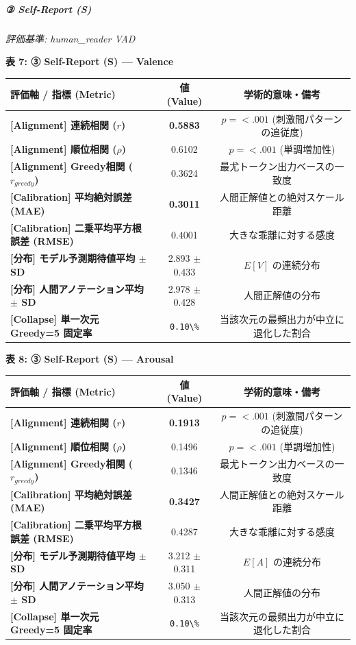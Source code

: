 \subparagraph{③ Self-Report (S)}
\textit{評価基準: human\_reader VAD}

\textbf{表 7: ③ Self-Report (S) — Valence}
\begin{center}
\small
\begin{tabular}{lcc}
\toprule
\textbf{評価軸 / 指標 (Metric)} & \textbf{値 (Value)} & \textbf{学術的意味・備考} \\
\midrule
\textbf{[Alignment] 連続相関 ($r$)} & \textbf{0.5883} & $p = <.001 $ (刺激間パターンの追従度) \\
\textbf{[Alignment] 順位相関 ($\rho$)} & 0.6102 & $p = <.001 $ (単調増加性) \\
\textbf{[Alignment] Greedy相関 ($r_{greedy}$)} & 0.3624 & 最尤トークン出力ベースの一致度 \\
\textbf{[Calibration] 平均絶対誤差 (MAE)} & \textbf{0.3011} & 人間正解値との絶対スケール距離 \\
\textbf{[Calibration] 二乗平均平方根誤差 (RMSE)} & 0.4001 & 大きな乖離に対する感度 \\
\textbf{[分布] モデル予測期待値平均 $\pm$ SD} & 2.893 $\pm$ 0.433 & $E[V]$ の連続分布 \\
\textbf{[分布] 人間アノテーション平均 $\pm$ SD} & 2.978 $\pm$ 0.428 & 人間正解値の分布 \\
\textbf{[Collapse] 単一次元 Greedy=5 固定率} & \texttt{0.10\textbackslash{}\%} & 当該次元の最頻出力が中立に退化した割合 \\
\bottomrule
\end{tabular}
\end{center}


\textbf{表 8: ③ Self-Report (S) — Arousal}
\begin{center}
\small
\begin{tabular}{lcc}
\toprule
\textbf{評価軸 / 指標 (Metric)} & \textbf{値 (Value)} & \textbf{学術的意味・備考} \\
\midrule
\textbf{[Alignment] 連続相関 ($r$)} & \textbf{0.1913} & $p = <.001 $ (刺激間パターンの追従度) \\
\textbf{[Alignment] 順位相関 ($\rho$)} & 0.1496 & $p = <.001 $ (単調増加性) \\
\textbf{[Alignment] Greedy相関 ($r_{greedy}$)} & 0.1346 & 最尤トークン出力ベースの一致度 \\
\textbf{[Calibration] 平均絶対誤差 (MAE)} & \textbf{0.3427} & 人間正解値との絶対スケール距離 \\
\textbf{[Calibration] 二乗平均平方根誤差 (RMSE)} & 0.4287 & 大きな乖離に対する感度 \\
\textbf{[分布] モデル予測期待値平均 $\pm$ SD} & 3.212 $\pm$ 0.311 & $E[A]$ の連続分布 \\
\textbf{[分布] 人間アノテーション平均 $\pm$ SD} & 3.050 $\pm$ 0.313 & 人間正解値の分布 \\
\textbf{[Collapse] 単一次元 Greedy=5 固定率} & \texttt{0.10\textbackslash{}\%} & 当該次元の最頻出力が中立に退化した割合 \\
\bottomrule
\end{tabular}
\end{center}


